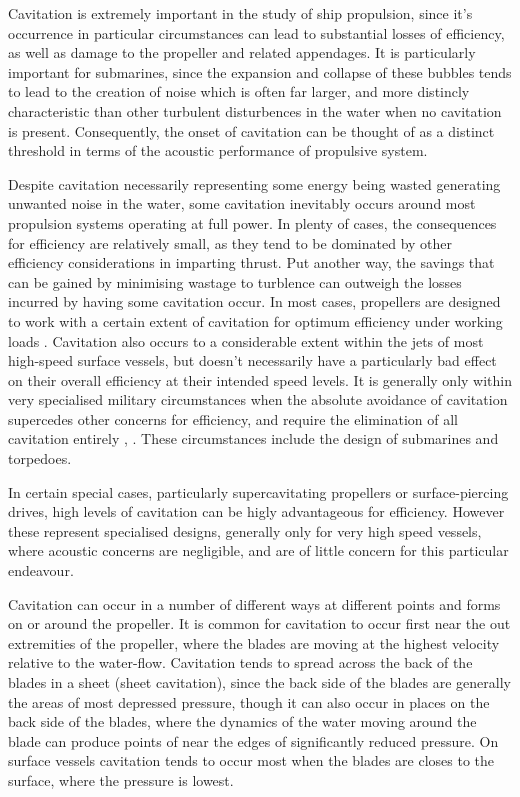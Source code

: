 \documentclass{article}\usepackage[]{graphicx}\usepackage[]{color}
\begin{document}
Cavitation is extremely important in the study of ship propulsion, since it's occurrence in particular circumstances can lead to substantial losses of efficiency, as well as damage to the propeller and related appendages. It is particularly important for submarines, since the expansion and collapse of these bubbles tends to lead to the creation of noise which is often far larger, and more distincly characteristic than other turbulent disturbences in the water when no cavitation is present.  Consequently, the onset of cavitation can be thought of as a distinct threshold in terms of the acoustic performance of propulsive system.

Despite cavitation necessarily representing some energy being wasted generating unwanted noise in the water, some cavitation inevitably occurs around most propulsion systems operating at full power.  In plenty of cases, the consequences for efficiency are relatively small, as they tend to be dominated by other efficiency considerations in imparting thrust.  Put another way, the savings that can be gained by minimising wastage to turblence can outweigh the losses incurred by having some cavitation occur.  In most cases, propellers are designed to work with a certain extent of cavitation for optimum efficiency under working loads \parencite{shin2015}. Cavitation also occurs to a considerable extent within the jets of most high-speed surface vessels, but doesn't necessarily have a particularly bad effect on their overall efficiency at their intended speed levels.  It is generally only within very specialised military circumstances when the absolute avoidance of cavitation supercedes other concerns for efficiency, and require the elimination of all cavitation entirely \parencite{mollard2011}, \parencite{lewis1988}.  These circumstances include the design of submarines and torpedoes.

In certain special cases, particularly supercavitating propellers or surface-piercing drives, high levels of cavitation can be higly advantageous for efficiency.  However these represent specialised designs, generally only for very high speed vessels, where acoustic concerns are negligible, and are of little concern for this particular endeavour.

Cavitation can occur in a number of different ways at different points and forms on or around the propeller.  It is common for cavitation to occur first near the out extremities of the propeller, where the blades are moving at the highest velocity relative to the water-flow.  Cavitation tends to spread across the back of the blades in a sheet (sheet cavitation), since the back side of the blades are generally the areas of most depressed pressure, though it can also occur in places on the back side of the blades, where the dynamics of the water moving around the blade can produce points of near the edges of significantly reduced pressure.   On surface vessels cavitation tends to occur most when the blades are closes to the surface, where the pressure is lowest.
\end{document}
